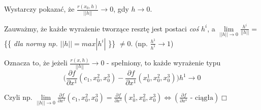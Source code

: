 \documentclass[../main.tex]{subfiles}
\begin{document}
Wystarczy pokazać, że $\frac{r(x_0,h)}{||h||}\to 0$, gdy $h\to 0$.

Zauważmy, że każde wyrażenie tworzące resztę jest postaci \textit{coś} $h^i$, a $\lim\limits_{||h|| \to 0}\frac{h^i}{||h||} =$ \{\{ \textit{dla normy np.} $||h|| = max{|h^i|}$ \}\} $\neq 0$.
(np. $\frac{h^1}{h^1} \to 1$)

Oznacza to, że jeżeli $\frac{r(x,h)}{||h||}\to 0$ - spełniony, to każde wyrażenie typu
$$ \Big ( \frac{\partial f}{\partial x^1} (c_1,x_0^2,x_0^3) - \frac{\partial f}{\partial x^1} (x_0^1,x_0^2,x_0^3)\Big ) h^1 \to 0$$

Czyli np. $\lim\limits_{||h|| \to 0}\frac{\partial f}{\partial x^1} (c_1,x_0^2,x_0^3) = \frac{\partial f}{\partial x^1} (x_0^1,x_0^2,x_0^3) \iff (\frac{\partial f}{\partial x^1}  \text{ - ciągła} ) \Box$
\end{document}
